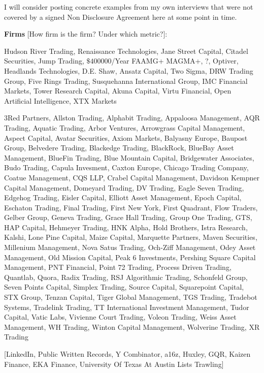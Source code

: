 I will consider posting concrete examples from my own interviews that were not covered by a signed Non Disclosure Agreement here at some point in time.

\newpage

\textbf{Firms} [How firm is the firm? Under which metric?]:

Hudson River Trading, Renaissance Technologies, Jane Street Capital, Citadel Securities, Jump Trading, $\$ 400000$/Year FAAMG+ MAGMA+, ?, Optiver, Headlands Technologies, D.E. Shaw, Ansatz Capital, Two Sigma, DRW Trading Group, Five Rings Trading, Susquehanna International Group, IMC Financial Markets, Tower Research Capital, Akuna Capital, Virtu Financial, Open Artificial Intelligence, XTX Markets

3Red Partners, Allston Trading, Alphabit Trading, Appaloosa Management, AQR Trading, Aquatic Trading, Arbor Ventures, Arrowgrass Capital Management, Aspect Capital, Avatar Securities, Axiom Markets, Balyasny Europe, Baupost Group, Belvedere Trading, Blackedge Trading, BlackRock, BlueBay Asset Management, BlueFin Trading, Blue Mountain Capital, Bridgewater Associates, Budo Trading, Capula Invesment, Caxton Europe, Chicago Trading Company, Coatue Management, CQS LLP, Crabel Capital Management, Davidson Kempner Capital Management, Domeyard Trading, DV Trading, Eagle Seven Trading, Edgehog Trading, Eisler Capital, Elliott Asset Management, Epoch Capital, Eschaton Trading, Final Trading, First New York, First Quadrant, Flow Traders, Gelber Group, Geneva Trading, Grace Hall Trading, Group One Trading, GTS, HAP Capital, Hehmeyer Trading, HNK Alpha, Hold Brothers, Istra Research, Kalshi, Lone Pine Capital, Maize Capital, Marquette Partners, Maven Securities, Millenium Management, Nova Satus Trading, Och-Ziff Management, Odey Asset Management, Old Mission Capital, Peak 6 Investments, Pershing Square Capital Management, PNT Financial, Point 72 Trading, Process Driven Trading, Quantlab, Quora, Radix Trading, RSJ Algorithmic Trading, Schonfeld Group, Seven Points Capital, Simplex Trading, Source Capital, Squarepoint Capital, STX Group, Tenzan Capital, Tiger Global Management, TGS Trading, Tradebot Systems, Tradelink Trading, TT International Investment Management, Tudor Capital, Vatic Labs, Vivienne Court Trading, Voleon Trading, Weiss Asset Management, WH Trading, Winton Capital Management, Wolverine Trading, XR Trading

[LinkedIn, Public Written Records, Y Combinator, a16z, Huxley, GQR, Kaizen Finance, EKA Finance, University Of Texas At Austin Lists Trawling]

